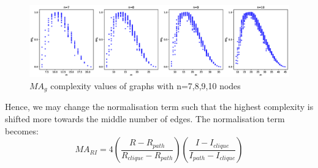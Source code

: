 \documentclass[12pt]{article}
\begin{document}
\begin{figure}[ht]
    \includegraphics[width=\textwidth]{mag.eps}
    \centering
    \caption{$MA_g$ complexity values of graphs with n=7,8,9,10 nodes}
    \label{fig:mag}
\end{figure}
\noindent
Hence, we may change the normalisation term such that the highest complexity is shifted more towards the middle number of edges. The normalisation term becomes:
\begin{equation}
    \label{eq:mari}
    MA_{RI} = 4(\frac{R-R_{path}}{R_{clique}-R_{path}})(\frac{I-I_{clique}}{I_{path}-I_{clique}})
\end{equation}
\end{document}
